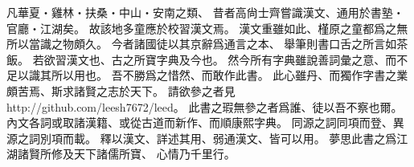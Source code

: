 凡華夏・雞林・扶桑・中山・安南之類、
昔者高尙士齊嘗識漢文、通用於書塾・官廳・江湖矣。
故該地多童應於校習漢文焉。
漢文重雖如此、槿原之童都爲之無所以當識之物頗久。
今者諸國徒以其京辭爲通言之本、
舉筆則書口舌之所言如茶飯。
若欲習漢文也、古之所寶字典及今也。
然今所有字典雖說善詞彙之意、而不足以識其所以用也。
吾不勝爲之惜然、而敢作此書。
此心雖丹、而獨作字書之業頗苦焉、斯求諸賢之志於天下。
請欲參之者見 http://github.com/leesh7672/leed。
此書之瑕無參之者爲誰、徒以吾不察也爾。
內文各詞或取諸漢籍、或從古道而新作、而順康熙字典。
同源之詞同項而登、異源之詞別項而載。
釋以漢文、詳述其用、弱通漢文、皆可以用。
夢思此書之爲江湖諸賢所修及天下諸儒所寶、
心情乃千里行。
